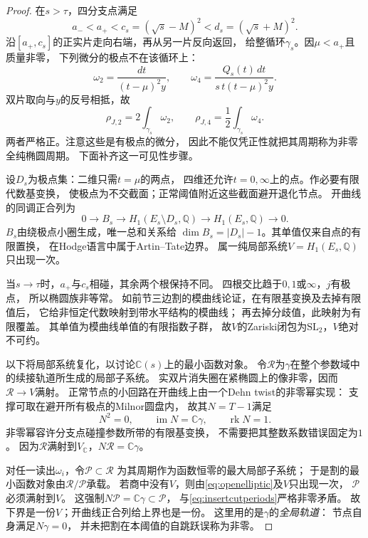 \documentclass[11pt,a4paper]{ctexart}
\theoremstyle{cnplain}\newtheorem{theorem}{定理}[section]
\theoremstyle{definition}\newtheorem{definition}[theorem]{定义}
\theoremstyle{remark}\newtheorem{remark}[theorem]{注}
\newcommand{\Q}{\mathbb Q}\newcommand{\cC}{\mathcal C}
\newcommand{\rk}{\operatorname{rk}}\newcommand{\im}{\operatorname{im}}
\begin{document}
\begin{proof}
在$s>\tau$，四分支点满足
\[
 a_-<a_+<c_s=(\sqrt s-M)^2<d_s=(\sqrt s+M)^2.
\]
沿$[a_+,c_s]$的正实片走向右端，再从另一片反向返回，
给整循环$\gamma_s$。因$\mu<a_+$且质量非零，
下列微分的极点不在该循环上：
\[
 \omega_2=\frac{dt}{(t-\mu)^2y},\qquad
 \omega_4=\frac{Q_s(t)\,dt}{s\,t(t-\mu)^2y}.
\]
双片取向与$y$的反号相抵，故
\begin{equation}\label{eq:insertcutperiods}
 \rho_{J,2}=2\int_{\gamma_s}\omega_2,\qquad
 \rho_{J,4}=\frac12\int_{\gamma_s}\omega_4.
\end{equation}
两者严格正。注意这些是有极点的微分，
因此不能仅凭正性就把其周期称为非零全纯椭圆周期。
下面补齐这一可见性步骤。

设$D_s$为极点集：二维只需$t=\mu$的两点，
四维还允许$t=0,\infty$上的点。作必要有限代数基变换，
使极点为不交截面；正常阈值附近这些截面避开退化节点。
开曲线的同调正合列为
\begin{equation}\label{eq:openelliptic}
 0\longrightarrow B_s\longrightarrow
 H_1(E_s\setminus D_s,\Q)
 \longrightarrow H_1(E_s,\Q)\longrightarrow0 .
\end{equation}
$B_s$由绕极点小圈生成，唯一总和关系给
$\dim B_s=|D_s|-1$。其单值仅来自点的有限置换，
在Hodge语言中属于Artin--Tate边界。
属一纯局部系统$V=H_1(E_s,\Q)$只出现一次。

当$s\to\tau$时，$a_+$与$c_s$相碰，其余两个根保持不同。
四根交比趋于$0,1$或$\infty$，$j$有极点，
所以椭圆族非等常。
如前节三边割的模曲线论证，在有限基变换及去掉有限值后，
它给非恒定代数映射到带水平结构的模曲线；
再去掉分歧值，此映射为有限覆盖。
其单值为模曲线单值的有限指数子群，
故$V$的Zariski闭包为$\mathrm{SL}_2$，$V$绝对不可约。

以下将局部系统复化，以讨论$\mathbb C(s)$上的最小函数对象。
令$\mathcal R$为$\gamma$在整个参数域中的续接轨道所生成的局部子系统。
实双片消失圈在紧椭圆上的像非零，因而
$\mathcal R\to V$满射。
正常节点的小回路在开曲线上由一个Dehn twist的非零幂实现：
支撑可取在避开所有极点的Milnor圆盘内，
故其$N=T-1$满足
\[
 N^2=0,\qquad \im N=\mathbb C\gamma,\qquad \rk N=1.
\]
非零幂容许分支点碰撞参数所带的有限基变换，
不需要把其整数系数错误固定为$1$。
因为$\mathcal R$满射到$V_{\mathbb C}$，$N\mathcal R=\mathbb C\gamma$。

对任一读出$\omega_i$，令$\mathcal P\subset\mathcal R$
为其周期作为函数恒零的最大局部子系统；
于是割的最小函数对象由$\mathcal R/\mathcal P$承载。
若商中没有$V$，则由\eqref{eq:openelliptic}及$V$只出现一次，
$\mathcal P$必须满射到$V$。
这强制$N\mathcal P=\mathbb C\gamma\subset\mathcal P$，
与\eqref{eq:insertcutperiods}严格非零矛盾。
故下界是一份$V$；开曲线正合列给上界也是一份。
这里用的是$\gamma$的\emph{全局轨道}：
节点自身满足$N\gamma=0$，
并未把割在本阈值的自跳跃误称为非零。


\end{proof}
\end{document}
